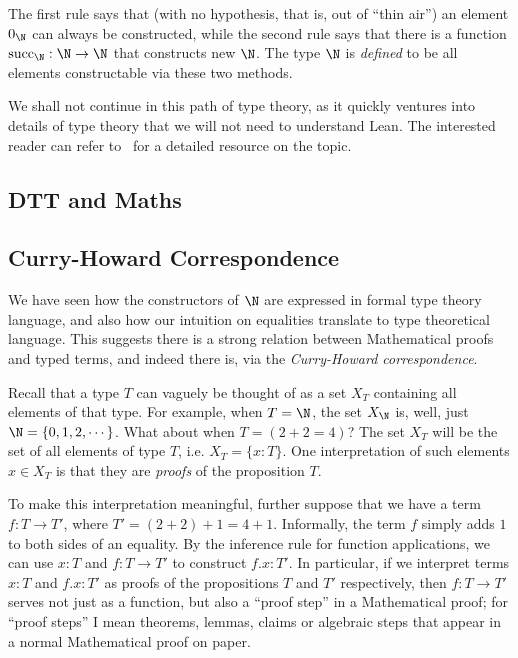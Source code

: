 The first rule says that (with no hypothesis, that is, out of ``thin air'') an element \(0_{\N}\) can always be constructed, while the second rule says that there is a function \(\mathrm{succ}_{\N} : \N \to \N\) that constructs new \(\N\). The type \(\N\) is \textit{defined} to be all elements constructable via these two methods.

We shall not continue in this path of type theory, as it quickly ventures into details of type theory that we will not need to understand Lean. The interested reader can refer to~\cite{Rijke2022} for a detailed resource on the topic.

\subsection{DTT and Maths}

\subsection{Curry-Howard Correspondence}

We have seen how the constructors of \(\N\) are expressed in formal type theory language, and also how our intuition on equalities translate to type theoretical language. This suggests there is a strong relation between Mathematical proofs and typed terms, and indeed there is, via the \textit{Curry-Howard correspondence}.

Recall that a type \(T\) can vaguely be thought of as a set \(X_T\) containing all elements of that type. For example, when \(T = \N\), the set \(X_{\N}\) is, well, just \(\N = \{0, 1, 2, \cdots\}\). What about when \(T = (2 + 2 = 4)\)? The set \(X_T\) will be the set of all elements of type \(T\), i.e. \(X_T = \{x : T\}\). One interpretation of such elements \(x \in X_T\) is that they are \textit{proofs} of the proposition \(T\).

To make this interpretation meaningful, further suppose that we have a term \(f : T \to T'\), where \(T' = (2 + 2) + 1 = 4 + 1\). Informally, the term \(f\) simply adds \(1\) to both sides of an equality. By the inference rule for function applications, we can use \(x : T\) and \(f : T \to T'\) to construct \(f.x : T'\). In particular, if we interpret terms \(x : T\) and \(f.x : T'\) as proofs of the propositions \(T\) and \(T'\) respectively, then \(f : T \to T'\) serves not just as a function, but also a ``proof step'' in a Mathematical proof; for ``proof steps'' I mean theorems, lemmas, claims or algebraic steps that appear in a normal Mathematical proof on paper.
